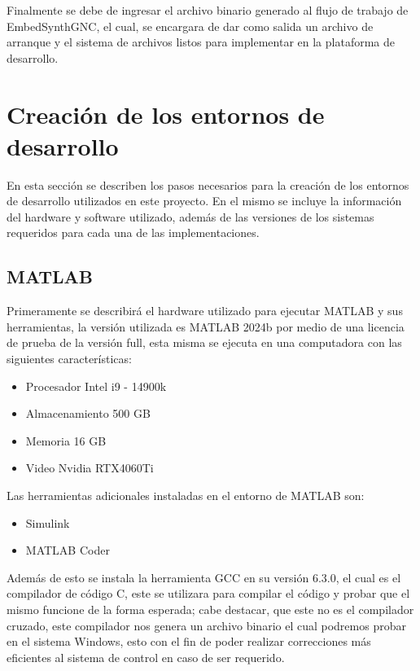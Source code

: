 Finalmente se debe de ingresar el archivo binario generado al flujo de trabajo de EmbedSynthGNC, el cual, se encargara de dar como salida un archivo de arranque y el sistema de archivos listos para implementar en la plataforma de desarrollo.


\section{Creación de los entornos de desarrollo}

En esta sección se describen los pasos necesarios para la creación de los entornos de desarrollo utilizados en este proyecto. En el mismo se incluye la información del hardware y software utilizado, además de las versiones de los sistemas requeridos para cada una de las implementaciones. 

\subsection{MATLAB}\label{subsec:generacion_entorno_matlab}
Primeramente se describirá el hardware utilizado para ejecutar MATLAB y sus herramientas, la versión utilizada es MATLAB 2024b por medio de una licencia de prueba de la versión full, esta misma se ejecuta en una computadora con las siguientes características: 
\begin{itemize}
    \item Procesador Intel i9 - 14900k 
    \item Almacenamiento 500 GB 
    \item Memoria 16 GB
    \item Video Nvidia RTX4060Ti
\end{itemize}

Las herramientas adicionales instaladas en el entorno de MATLAB son:

\begin{itemize}
    \item Simulink
    \item MATLAB Coder
\end{itemize}

Además de esto se instala la herramienta GCC en su versión 6.3.0, el cual es el compilador de código C, este se utilizara para compilar el código y probar que el mismo funcione de la forma esperada; cabe destacar, que este no es el compilador cruzado, este compilador nos genera un archivo binario el cual podremos probar en el sistema Windows, esto con el fin de poder realizar correcciones más eficientes al sistema de control en caso de ser requerido.

